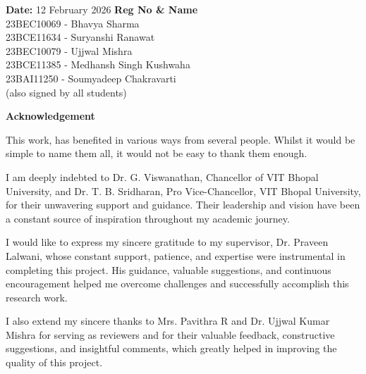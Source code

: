 \documentclass[12pt]{article}
\begin{document}
\vspace{2cm}

\noindent \textbf{Date:} 12 February 2026 \hfill \textbf{Reg No \& Name} \\
\null \hfill 23BEC10069 - Bhavya Sharma \\
\null \hfill 23BCE11634 - Suryanshi Ranawat \\
\null \hfill 23BEC10079 - Ujjwal Mishra \\
\null \hfill 23BCE11385 - Medhansh Singh Kushwaha \\
\null \hfill 23BAI11250 - Soumyadeep Chakravarti \\
\null \hfill (also signed by all students)

\newpage
\begin{center}
    \textbf{\Large Acknowledgement}
\end{center}

\vspace{1cm}

\noindent This work, has benefited in various ways from several people. Whilst it would be simple to name them all, it would not be easy to thank them enough.

\vspace{0.5cm}

\noindent I am deeply indebted to Dr. G. Viswanathan, Chancellor of VIT Bhopal University, and Dr. T. B. Sridharan, Pro Vice-Chancellor, VIT Bhopal University, for their unwavering support and guidance. Their leadership and vision have been a constant source of inspiration throughout my academic journey.

\vspace{0.5cm}

\noindent I would like to express my sincere gratitude to my supervisor, Dr. Praveen Lalwani, whose constant support, patience, and expertise were instrumental in completing this project. His guidance, valuable suggestions, and continuous encouragement helped me overcome challenges and successfully accomplish this research work.

\vspace{0.5cm}

\noindent I also extend my sincere thanks to Mrs. Pavithra R and Dr. Ujjwal Kumar Mishra for serving as reviewers and for their valuable feedback, constructive suggestions, and insightful comments, which greatly helped in improving the quality of this project.

\vspace{0.5cm}
\end{document}
